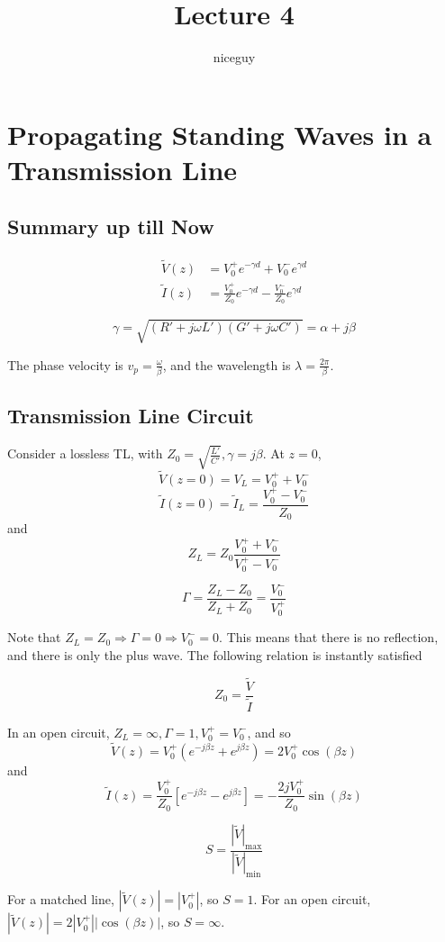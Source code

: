 \documentclass[12pt]{article}
\title{Lecture 4}
\author{niceguy}
\begin{document}
\maketitle

\section{Propagating Standing Waves in a Transmission Line}

\subsection{Summary up till Now}

\begin{align*}
    \tilde V(z) &= V_0^+ e^{-\gamma d} + V_0^-e^{\gamma d} \\
    \tilde I(z) &= \frac{V_0^+}{Z_0} e^{-\gamma d} - \frac{V_0^-}{Z_0} e^{\gamma d}
\end{align*}

$$\gamma = \sqrt{(R'+j\omega L')(G'+j\omega C')} = \alpha + j\beta$$

The phase velocity is $v_p = \frac{\omega}{\beta}$, and the wavelength is $\lambda = \frac{2\pi}{\beta}$.

\subsection{Transmission Line Circuit}

Consider a lossless TL, with $Z_0 = \sqrt{\frac{L'}{C'}}, \gamma = j\beta$. At $z = 0$,
$$\tilde V(z=0) = V_L = V_0^+ + V_0^-$$
$$\tilde I(z=0) = \tilde I_L = \frac{V_0^+ - V_0^-}{Z_0}$$
and
$$Z_L = Z_0 \frac{V_0^+ + V_0^-}{V_0^+ - V_0^-}$$

\begin{defn}
    $$\Gamma = \frac{Z_L - Z_0}{Z_L + Z_0} = \frac{V_0^-}{V_0^+}$$
\end{defn}

Note that $Z_L = Z_0 \Rightarrow \Gamma = 0 \Rightarrow V_0^- = 0$. This means that there is no reflection, and there is only the plus wave. The following relation is instantly satisfied

$$Z_0 = \frac{\tilde V}{\tilde I}$$

In an open circuit, $Z_L = \infty, \Gamma = 1, V_0^+ = V_0^-$, and so
$$\tilde V(z) = V_0^+(e^{-j\beta z} + e^{j\beta z}) = 2V_0^+\cos(\beta z)$$
and
$$\tilde I(z) = \frac{V_0^+}{Z_0}[e^{-j\beta z} - e^{j\beta z}] = -\frac{2jV_0^+}{Z_0} \sin(\beta z)$$

\begin{defn}
    $$S = \frac{|\tilde V|_{\text{max}}}{|\tilde V|_{\text{min}}}$$
\end{defn}

For a matched line, $|\tilde V(z)| = |V_0^+|$, so $S = 1$. For an open circuit, $|\tilde V(z)| = 2|V_0^+||\cos(\beta z)|$, so $S = \infty$.
\end{document}
